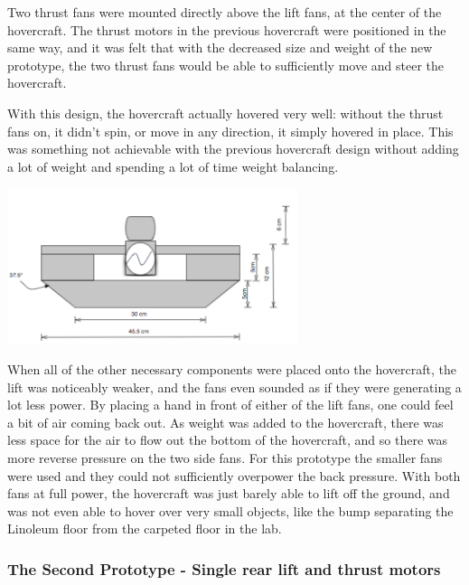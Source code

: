 \begin{minipage}{6.5in}
\begin{minipage}{6.5in}
Two thrust fans were mounted directly above the lift fans, at the center of the hovercraft. The thrust motors in the previous
hovercraft were positioned in the same way, and it was felt that with the decreased size and weight of the new prototype, the 
two thrust fans would be able to sufficiently move and steer the hovercraft.

With this design, the hovercraft actually hovered very well: without the thrust fans on, it didn't spin, or move in 
any direction, it simply hovered in place. This was something not achievable with the previous hovercraft design 
without adding a lot of weight and spending a lot of time weight balancing.

\begin{minipage}{6.5in}
\begin{center}
  \includegraphics[width=85mm]{imageSources/SideView2.png}
\end{center}
\label{Side2}
\end{minipage}

When all of the other necessary components were placed onto the hovercraft, the lift was noticeably weaker, and the fans
even sounded as if they were generating a lot less power. By placing a hand in front of either of the lift fans, one could feel
a bit of air coming back out. As weight was added to the hovercraft, there was less space for the air to flow out the bottom
of the hovercraft, and so there was more reverse pressure on the two side fans. For this prototype the smaller fans were used
and they could not sufficiently overpower the back pressure. With both fans at full power, the hovercraft was just barely able
to lift off the ground, and was not even able to hover over very small objects, like the bump separating the Linoleum floor
from the carpeted floor in the lab. 

\subsubsection{The Second Prototype - Single rear lift and thrust motors}


\end{minipage}
\end{minipage}
